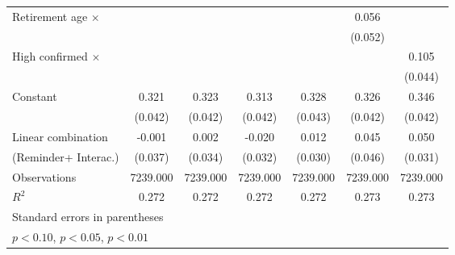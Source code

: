 {\begin{tabular}{l*{6}{c}}
\addlinespace
Retirement age $\times$&                     &                     &                     &                     &       0.056         &                     \\
                    &                     &                     &                     &                     &     (0.052)         &                     \\
\addlinespace
High confirmed $\times$&                     &                     &                     &                     &                     &       0.105\sym{**} \\
                    &                     &                     &                     &                     &                     &     (0.044)         \\
\addlinespace
Constant            &       0.321\sym{***}&       0.323\sym{***}&       0.313\sym{***}&       0.328\sym{***}&       0.326\sym{***}&       0.346\sym{***}\\
                    &     (0.042)         &     (0.042)         &     (0.042)         &     (0.043)         &     (0.042)         &     (0.042)         \\
\midrule
Linear combination  &      -0.001         &       0.002         &      -0.020         &       0.012         &       0.045         &       0.050         \\
(Reminder+ Interac.)&     (0.037)         &     (0.034)         &     (0.032)         &     (0.030)         &     (0.046)         &     (0.031)         \\
Observations        &    7239.000         &    7239.000         &    7239.000         &    7239.000         &    7239.000         &    7239.000         \\
\(R^{2}\)           &       0.272         &       0.272         &       0.272         &       0.272         &       0.273         &       0.273         \\
\bottomrule
\multicolumn{7}{l}{\footnotesize Standard errors in parentheses}\\
\multicolumn{7}{l}{\footnotesize \sym{*} \(p<0.10\), \sym{**} \(p<0.05\), \sym{***} \(p<0.01\)}\\
\end{tabular}
}
